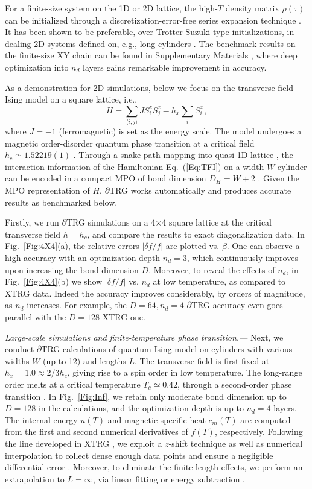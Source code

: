 \documentclass[aps,prx,twocolumn,showpacs,psfig,superscriptaddress,longbibliography]{revtex4-1}
\newcommand{\Fig}[1]{Fig.~\ref{#1}}
\def\dTRG{$\partial$TRG\xspace}
\begin{document}
For a finite-size system on the 1D or 2D lattice, the high-$T$ density matrix $\rho(\tau)$ can be initialized 
through a discretization-error-free series expansion technique \cite{Chen.b+:2017:SETTN, SM}. 
It has been shown to be preferable, over Trotter-Suzuki type initializations, in dealing 2D systems defined on, 
e.g., long cylinders \cite{Chen2018,Li2019}. The benchmark results on the finite-size 
XY chain can be found in Supplementary Materials \cite{SM}, 
where deep optimization into $n_d$ layers gains remarkable improvement in accuracy.

As a demonstration for 2D simulations, below we focus on the transverse-field Ising model on a square lattice, i.e.,  
\begin{equation}
H = \sum_{\langle i,j \rangle} J S_i^z S_j^z - {h_x} \sum_i S_i^x,
\label{Eq:TFI}
\end{equation} 
where $J=-1$ (ferromagnetic) is set as the energy scale. The model undergoes a magnetic order-disorder quantum phase transition at a critical field $h_c\simeq 1.52219(1)$ \cite{Bloete2002}. Through a snake-path mapping into quasi-1D lattice \cite{Li2019}, the interaction information of the Hamiltonian Eq.~(\ref{Eq:TFI}) on a width $W$ cylinder can be encoded in a compact MPO of bond dimension $D_H = W +2$ \cite{Chen2018,Li2019b}. Given the MPO representation of $H$, \dTRG works automatically and produces accurate results as benchmarked below.

Firstly, we run \dTRG simulations on a 4$\times$4 square lattice at the critical transverse field $h=h_c$, and compare the results to exact diagonalization data. In \Fig{Fig:4X4}(a), the relative errors $|\delta f/f|$ are plotted vs. $\beta$. One can observe a high accuracy with an optimization depth $n_d=3$, which continuously improves upon increasing the bond dimension $D$. Moreover, to reveal the effects of $n_d$, in \Fig{Fig:4X4}(b) we show $|\delta f/f|$ vs. $n_d$ at low temperature, as compared to XTRG data. Indeed the accuracy improves considerably, by orders of magnitude, as $n_d$ increases. For example, the $D=64,n_d=4$ \dTRG accuracy even goes parallel with the $D=128$ XTRG one. 

\textit{Large-scale simulations and finite-temperature phase transition.---} Next, we conduct \dTRG calculations of quantum Ising model on cylinders with various widths $W$ (up to 12) and lengths $L$. The transverse field is first fixed at $h_x=1.0 \approx 2/3h_c$, giving rise to a spin order in low temperature. The long-range order melts at a critical temperature $T_c\simeq 0.42$, through a second-order phase transition \cite{Czarnik.p+:2015:PEPS}. In \Fig{Fig:Inf}, we retain only moderate bond dimension up to $D=128$ in the calculations, and the optimization depth is up to $n_d=4$ layers. The internal energy $u(T)$ and magnetic specific heat $c_m(T)$ are computed from the first and second numerical derivatives of $f(T)$, respectively. Following the line developed in XTRG \cite{Chen2018,Li2019}, we exploit a $z$-shift technique as well as numerical interpolation to collect dense enough data points and ensure a negligible differential error \cite{SM}. Moreover, to eliminate the finite-length effects, we perform an extrapolation to $L=\infty$, via linear fitting or energy subtraction \cite{SM}. 
\end{document}
